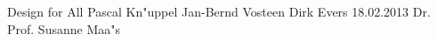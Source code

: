 \documentclass{header}
\begin{document}
        	{Design for All}
			{Pascal Kn"uppel}
			{Jan-Bernd Vosteen}
			{Dirk Evers}
			{18.02.2013}
			{Dr. Prof. Susanne Maa"s}
         
\pagestyle{empty}
 \tableofcontents
 
\newpage
\pagestyle{fancy}
 \setcounter{page}{1}  








 
\end{document}
